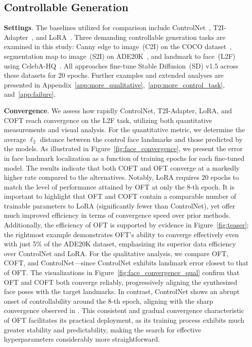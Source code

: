 \subsection{Controllable Generation}

\textbf{Settings}. The baselines utilized for comparison include ControlNet~\cite{zhang2023adding}, T2I-Adapter~\cite{mou2023t2i}, and LoRA~\cite{hulora2022}. Three demanding controllable generation tasks are examined in this study: Canny edge to image~(C2I) on the COCO dataset~\cite{lin2014microsoft}, segmentation map to image~(S2I) on ADE20K~\cite{zhou2017scene}, and landmark to face~(L2F) using CelebA-HQ~\cite{karras2018progressive,xia2021tedigan}. All approaches fine-tune Stable Diffusion~(SD) v1.5 across these datasets for 20 epochs. Further examples and extended analyses are presented in Appendix~\ref{app:more_qualitative},~\ref{app:more_control_task}, and~\ref{app:failure}.

\textbf{Convergence}. We assess how rapidly ControlNet, T2I-Adapter, LoRA, and COFT reach convergence on the L2F task, utilizing both quantitative measurements and visual analysis. For the quantitative metric, we determine the average $\ell_2$ distance between the control face landmarks and those predicted by the models. As illustrated in Figure~\ref{fig:face_convergence}, we present the error in face landmark localization as a function of training epochs for each fine-tuned model. The results indicate that both COFT and OFT converge at a markedly higher rate compared to the alternatives. Notably, LoRA requires 20 epochs to match the level of performance attained by OFT at only the 8-th epoch. It is important to highlight that OFT and COFT contain a comparable number of trainable parameters to LoRA (significantly fewer than ControlNet), yet offer much improved efficiency in terms of convergence speed over prior methods. Additionally, the efficiency of OFT is supported by evidence in Figure~\ref{fig:teaser}; the rightmost example demonstrates OFT’s ability to converge effectively even with just 5\% of the ADE20K dataset, emphasizing its superior data efficiency over ControlNet and LoRA. For the qualitative analysis, we compare OFT, COFT, and ControlNet—since ControlNet exhibits landmark error closest to that of OFT. The visualizations in Figure~\ref{fig:face_convergence_qual} confirm that OFT and COFT both converge reliably, progressively aligning the synthesized face poses with the target landmarks. In contrast, ControlNet shows an abrupt onset of controllability around the 8-th epoch, aligning with the sharp convergence observed in \cite{zhang2023adding}. This consistent and gradual convergence characteristic of OFT facilitates its practical deployment, as its training process exhibits much greater stability and predictability, making the search for effective hyperparameters considerably more straightforward.

